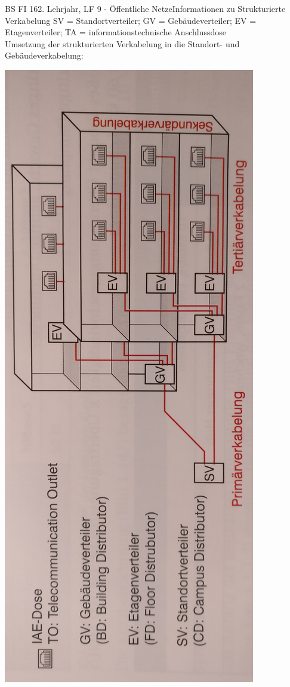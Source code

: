 \documentclass[11pt,twocolumn,oneside,openany,headings=optiontotoc,11pt,numbers=noenddot]{article}
\begin{document}
\begin{worksheet}{BS FI 16}{2. Lehrjahr, LF 9 - Öffentliche Netze}{Informationen zu \glqq{}Strukturierte Verkabelung\grqq{}}
		\tiny{SV = Standortverteiler; GV = Gebäudeverteiler; EV = Etagenverteiler; TA = informationstechnische Anschlussdose}\\
		\normalsize
		\newpage\noindent
		Umsetzung der strukturierten Verkabelung in die Standort- und Gebäudeverkabelung:\\
		\begin{center}
			\includegraphics[scale=0.1]{Bilder/Verkabelungsbereiche.jpg}
		\end{center}
		\newpage\noindent

\end{worksheet}
\end{document}
